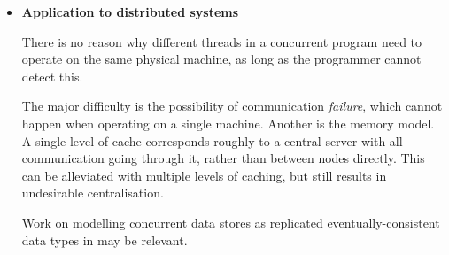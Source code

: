\begin{itemize}
\item \textbf{Application to distributed systems} \hfill

  There is no reason why different threads in a concurrent program
  need to operate on the same physical machine, as long as the
  programmer cannot detect this.

  The major difficulty is the possibility of communication
  \emph{failure}, which cannot happen when operating on a single
  machine. Another is the memory model. A single level of cache
  corresponds roughly to a central server with all communication going
  through it, rather than between nodes directly. This can be
  alleviated with multiple levels of caching, but still results in
  undesirable centralisation.

  Work on modelling concurrent data stores as replicated
  eventually-consistent data types in \citep{replicated} may be
  relevant.
\end{itemize}
